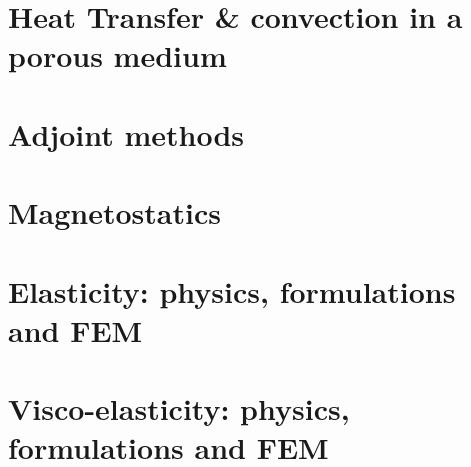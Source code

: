 \documentclass[a4paper]{article}
\numberwithin{equation}{section}
\begin{document}
\newpage
\section{Heat Transfer \& convection in a porous medium} %
 \label{chapt:porous}

\newpage
\section{Adjoint methods} %
 \label{chapt:adjoint}

\newpage
\section{Magnetostatics} %
 \label{chapt:magnetostatics}

\newpage
\section{Elasticity: physics, formulations and FEM } %
 \label{chapt:elasticity}

\newpage
\section{Visco-elasticity: physics, formulations and FEM } %
 \label{chapt:viscoelasticity}






\end{document}
